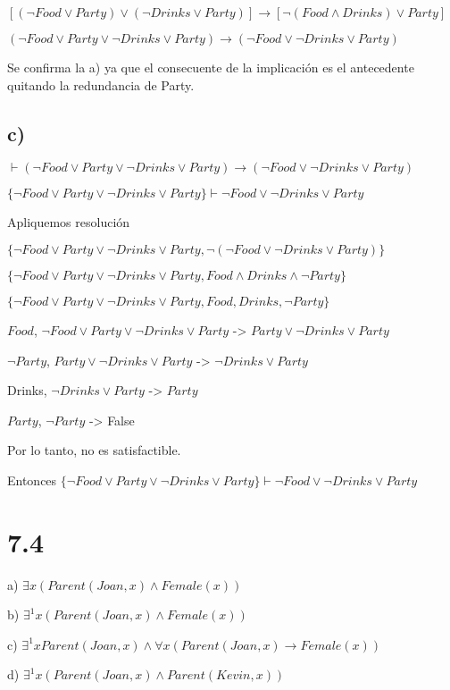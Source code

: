 \documentclass[spanish]{article}
\begin{document}
$[(\neg Food \vee Party)\vee(\neg Drinks\vee Party)] \rightarrow [\neg (Food \wedge Drinks)\vee Party]$

$(\neg Food \vee Party\vee\neg Drinks\vee Party) \rightarrow (\neg Food \vee \neg Drinks \vee Party)$

Se confirma la a) ya que el consecuente de la implicación es el antecedente quitando la redundancia de Party.

\subsection*{ c)}

$\vdash (\neg Food \vee Party\vee\neg Drinks\vee Party) \rightarrow (\neg Food \vee \neg Drinks \vee Party)$

$\{\neg Food \vee Party\vee\neg Drinks\vee Party\} \vdash \neg Food \vee \neg Drinks \vee Party$

Apliquemos resolución

$\{\neg Food \vee Party\vee\neg Drinks\vee Party, \neg(\neg Food \vee \neg Drinks \vee Party)\}$

$\{\neg Food \vee Party\vee\neg Drinks\vee Party,  Food \wedge  Drinks \wedge \neg Party\}$

$\{\neg Food \vee Party\vee\neg Drinks\vee Party,  Food,  Drinks, \neg Party\}$

$Food$, $\neg Food \vee Party\vee\neg Drinks\vee Party$ -> $Party\vee\neg Drinks\vee Party$

$\neg Party$, $Party\vee\neg Drinks\vee Party$ -> $\neg Drinks\vee Party$

Drinks, $\neg Drinks\vee Party$ -> $Party$

$Party$, $\neg Party$ -> False

Por lo tanto, no es satisfactible.

Entonces $\{\neg Food \vee Party\vee\neg Drinks\vee Party\} \vdash \neg Food \vee \neg Drinks \vee Party$

\section*{7.4}

a) $\exists x (Parent(Joan,x)\wedge Female(x))$

b) $\exists^1 x (Parent(Joan,x)\wedge Female(x))$

c) $\exists^1 x Parent(Joan,x) \wedge \forall x (Parent(Joan,x) \rightarrow Female(x))$

d) $\exists^1 x (Parent(Joan,x) \wedge Parent(Kevin,x))$
\end{document}
